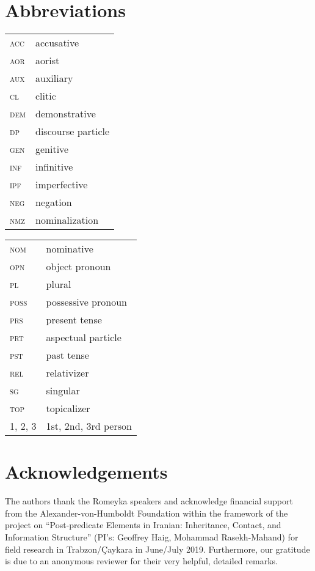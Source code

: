 \documentclass[output=paper,colorlinks,citecolor=brown]{langscibook}
\begin{document}
\section*{Abbreviations}
\begin{tabularx}{.45\textwidth}{lQ}
\textsc{acc} & accusative \\
\textsc{aor} & aorist \\
\textsc{aux} & auxiliary \\
\textsc{cl} & clitic \\
\textsc{dem} & demonstrative \\
\textsc{dp} & discourse particle \\
\textsc{gen} & genitive \\
\textsc{inf} & infinitive \\
\textsc{ipf} & imperfective \\
\textsc{neg} & negation \\
\textsc{nmz} & nominalization \\
\end{tabularx}
\begin{tabularx}{.45\textwidth}{lQ}
\textsc{nom} & nominative \\
\textsc{opn} & object pronoun \\
\textsc{pl} & plural \\
\textsc{poss} & possessive pronoun \\
\textsc{prs} & present tense \\
\textsc{prt} & aspectual particle \\
\textsc{pst} & past tense \\
\textsc{rel} & relativizer \\
\textsc{sg} & singular \\
\textsc{top} & topicalizer \\
1, 2, 3 & 1st, 2nd, 3rd person \\
\end{tabularx}

\section*{Acknowledgements}

\begin{sloppypar}
The authors thank the Romeyka speakers and acknowledge financial support from the Alexander-von-Humboldt Foundation within the framework of the project on ``Post-predicate Elements in Iranian: Inheritance, Contact, and Information Structure'' (PI's: Geoffrey Haig, Mohammad Rasekh-Mahand) for field research in Trabzon/Çaykara in June/July 2019. Furthermore, our gratitude is due to an anonymous reviewer for their very helpful, detailed remarks.
\end{sloppypar}

{\sloppy\printbibliography[heading=subbibliography,notkeyword=this]}
\end{document}
